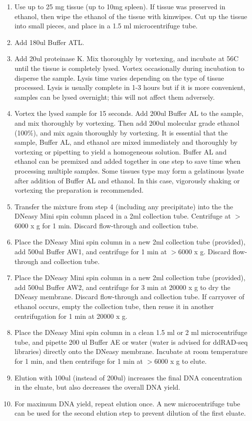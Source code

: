 \documentclass[11pt, oneside]{article}
\begin{document}
		\begin{enumerate}
			\item Use up to 25 mg tissue (up to 10mg spleen). If tissue was preserved in ethanol, then wipe the ethanol of the tissue with kimwipes. Cut up the tissue into small pieces, and place in a 1.5 ml microcentrifuge tube. 
			\item Add 180ul Buffer ATL. 
			\item Add 20ul proteinase K. Mix thoroughly by vortexing, and incubate at 56C until the tissue is completely lysed. Vortex occasionally 				during incubation to disperse the sample. Lysis time varies depending on the type of tissue processed. Lysis is usually complete in 1-3 				hours but if it is more convenient, samples can be lysed overnight; this will not affect them adversely. 
			\item Vortex the lysed sample for 15 seconds. Add 200ul Buffer AL to the sample, and mix thoroughly by vortexing. Then add 200ul molecular grade ethanol 			(100\%), and mix again thoroughly by vortexing. It is essential that the sample, Buffer AL, and ethanol are mixed immediately and 					thoroughly by vortexing or pipetting to yield a homogeneous solution. Buffer AL and ethanol can be premixed and added together in one 				step to save time when processing multiple samples. Some tissues type may form a gelatinous lysate after addition of Buffer AL and 				ethanol. In this case, vigorously shaking or vortexing the preparation is recommended. 
			\item Transfer the mixture from step 4 (including any precipitate) into the the DNeasy Mini spin column placed in a 2ml collection tube. 				Centrifuge at $>$6000 x g for 1 min. Discard flow-through and collection tube. 
			\item Place the DNeasy Mini spin column in a new 2ml collection tube (provided), add 500ul Buffer AW1, and centrifuge for 1 min at $>				$6000 x g. Discard flow-through and collection tube. 
			\item Place the DNeasy Mini spin column in a new 2ml collection tube (provided), add 500ul Buffer AW2, and centrifuge for 3 min at 20000 			x g to dry the DNeasy membrane. Discard flow-through and collection tube. If carryover of ethanol occurs, empty the collection tube, then 			reuse it in another centrifugation for 1 min at 20000 x g. 
			\item Place the DNeasy Mini spin column in a clean 1.5 ml or 2 ml microcentrifuge tube, and pipette 200 ul Buffer AE or water (water is 				advised for ddRAD-seq libraries) directly onto the DNeasy membrane. Incubate at room temperature for 1 min, and then centrifuge for 1 				min at $>$6000 x g to elute. 
			\item Elution with 100ul (instead of 200ul) increases the final DNA concentration in the eluate, but also decreases the overall DNA yield. 
			\item For maximum DNA yield, repeat elution once. A new microcentrifuge tube can be used for the second elution step to prevent dilution 			of the first eluate. 
		\end{enumerate}
	
\end{document}
